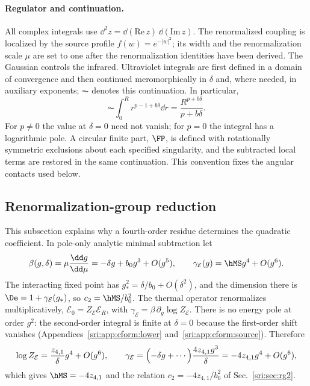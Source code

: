 \paragraph{Regulator and continuation.} All complex integrals use $\dd^2z=\dd(\mathrm{Re}\,z)\,\dd(\mathrm{Im}\,z)$.
The renormalized coupling is localized by the source profile $f(w)=e^{-|w|^2}$; its width and the renormalization
scale $\mu$ are set to one after the renormalization identities have been derived. The Gaussian controls the
infrared. Ultraviolet integrals are first defined in a domain of convergence and then continued meromorphically in
$\delta$ and, where needed, in auxiliary exponents; $\AC$ denotes this continuation. In particular,
\begin{equation}
 \AC\!\int_0^R r^{p-1+b\delta}\dd r=\frac{R^{p+b\delta}}{p+b\delta}.
 \label{sri:eq:cform:mellin}
\end{equation}
For $p\ne0$ the value at $\delta=0$ need not vanish; for $p=0$ the integral has a logarithmic pole. A circular finite
part, $\FP$, is defined with rotationally symmetric exclusions about each specified singularity, and the subtracted
local terms are restored in the same continuation. This convention fixes the angular contacts used below.

\subsection{Renormalization-group reduction}\label{sri:app:cform:rg}
This subsection explains why a fourth-order residue determines the quadratic coefficient. In pole-only analytic
minimal subtraction let
\begin{equation}
 \beta(g,\delta)=\mu\frac{\dd g}{\dd\mu}=-\delta g+b_0g^3+O(g^5),\qquad
 \gamma_{\mathcal E}(g)=\hMS g^4+O(g^6).
\end{equation}
The interacting fixed point has $g_*^2=\delta/b_0+O(\delta^2)$, and the dimension there is
$\De=1+\gamma_{\mathcal E}(g_*)$, so $c_2=\hMS/b_0^2$. The thermal operator renormalizes multiplicatively,
$\mathcal E_0=Z_{\mathcal E}\mathcal E_R$, with $\gamma_{\mathcal E}=\beta\,\partial_g\log Z_{\mathcal E}$. There is no
energy pole at order $g^2$: the second-order integral is finite at $\delta=0$ because the first-order shift vanishes
(Appendices~\ref{sri:app:cform:lower} and~\ref{sri:app:cform:source}). Therefore
\begin{equation}
 \log Z_{\mathcal E}=\frac{z_{4,1}}{\delta}g^4+O(g^6),\qquad
 \gamma_{\mathcal E}=\Bigl(-\delta g+\cdots\Bigr)\frac{4z_{4,1}g^3}{\delta}=-4z_{4,1}g^4+O(g^6),
\end{equation}
which gives $\hMS=-4z_{4,1}$ and the relation $c_2=-4z_{4,1}/b_0^2$ of Sec.~\ref{sri:sec:rg2}.

